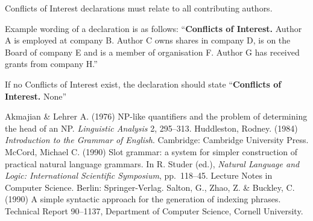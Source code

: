 \documentclass{jfp}
\begin{document}
\noindent Conflicts of Interest declarations must relate to all contributing authors.

\noindent Example wording of a declaration is as follows: ``\textbf{Conflicts of Interest.} Author A is employed at company B. Author C owns shares in company D, is on the Board of company E and is a member of organisation F. Author G has received grants from company H.''

\noindent If no Conflicts of Interest exist, the declaration should state ``\textbf{Conflicts of Interest.} None''

\begin{thebibliography}{}
   Akmajian \& Lehrer A. (1976) NP-like quantifiers and the
   problem of determining the head of an NP. {\it Linguistic
   Analysis\/} {2}, 295--313.
   Huddleston, Rodney. (1984) {\it Introduction to the Grammar of
   English}. Cambridge: Cambridge University Press.
   McCord, Michael C. (1990) Slot grammar: a system for simpler
   construction of practical natural language grammars. In R.
   Studer (ed.), {\it Natural Language and Logic: International
   Scientific Symposium}, pp.~118--45. Lecture Notes in Computer
   Science. Berlin: Springer-Verlag.
   Salton, G., Zhao, Z. \& Buckley, C. (1990)
   A simple syntactic approach for the generation of indexing
   phrases. Technical Report 90--1137, Department of Computer
   Science, Cornell University.
\end{thebibliography}

\label{lastpage01}
\end{document}
